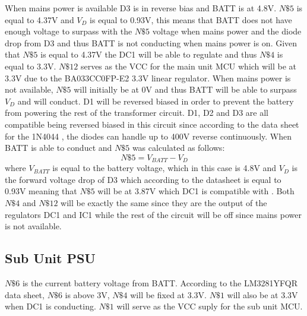 When mains power is available D3 is in reverse bias and BATT is at 4.8\si{\V}. $N\$5$ is equal to 4.37\si{\V} and $V_{D}$ is equal to 0.93\si{\V}, this means that BATT does not have enough voltage to surpass with the $N\$5$ voltage when mains power and the diode drop from D3 and thus BATT is not conducting when mains power is on. Given that $N\$5$ is equal to 4.37\si{\V} the DC1 will be able to regulate and thus $N\$4$ is equal to 3.3\si{\V}. $N\$12$ serves as the VCC for the main unit MCU which will be at 3.3V due to the BA033CC0FP-E2 3.3V linear regulator. When mains power is not available, $N\$5$ will initially be at 0\si{\V} and thus BATT will be able to surpass $V_{D}$ and will conduct. D1 will be reversed biased in order to prevent the battery from powering the rest of the transformer circuit. D1, D2 and D3 are all compatible being reversed biased in this circuit since according to the data sheet for the 1N4044 \cite{1N4004RLG}, the diodes can handle up to 400\si{\V} reverse continuously. When BATT is able to conduct and $N\$5$ was calculated as follows:
\begin{equation}
  N\$5 = V_{BATT} - V_{D}
  \label{eq:main-N5-BATT}
\end{equation}
where $V_{BATT}$ is equal to the battery voltage, which in this case is 4.8\si{\V} and $V_{D}$ is the forward voltage drop of D3 which according to the datasheet \cite{1N4004RLG} is equal to 0.93\si{\V} meaning that $N\$5$ will be at 3.87\si{\V} which DC1 is compatible with \cite{LM3281YFQR}. Both $N\$4$ and $N\$12$ will be exactly the same since they are the output of the regulators DC1 and IC1 while the rest of the circuit will be off since mains power is not available.
\subsection{Sub Unit PSU}
$N\$6$ is the current battery voltage from BATT. According to the LM3281YFQR data sheet, \cite{LM3281YFQR} $N\$6$ is above 3\si{\V}, $N\$4$ will be fixed at 3.3\si{\V}. $N\$1$ will also be at 3.3\si{\V} when DC1 is conducting. $N\$1$ will serve as the VCC suply for the sub unit MCU.
